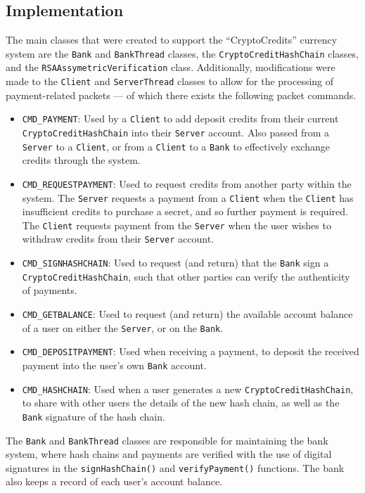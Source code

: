 \documentclass[a4paper,11pt]{article}
\begin{document}
\subsection{Implementation}
The main classes that were created to support the ``CryptoCredits'' currency
system are the \verb+Bank+ and \verb+BankThread+ classes, the
\verb+CryptoCreditHashChain+ classes, and the \verb+RSAAssymetricVerification+
class. Additionally, modifications were made to the \verb+Client+ and
\verb+ServerThread+ classes to allow for the processing of payment-related
packets --- of which there exists the following packet commands.

\begin{itemize}
\item \verb+CMD_PAYMENT+: Used by a \verb+Client+ to add deposit credits from
their current \verb+CryptoCreditHashChain+ into their \verb+Server+ account.
Also passed from a \verb+Server+ to a \verb+Client+, or from a \verb+Client+ to
a \verb+Bank+ to effectively exchange credits through the system.
\item \verb+CMD_REQUESTPAYMENT+: Used to request credits from another party
within the system. The \verb+Server+ requests a payment from a \verb+Client+
when the \verb+Client+ has insufficient credits to purchase a secret, and so
further payment is required. The \verb+Client+ requests payment from the
\verb+Server+ when the user wishes to withdraw credits from their \verb+Server+
account.
\item \verb+CMD_SIGNHASHCHAIN+: Used to request (and return) that the
\verb+Bank+ sign a \verb+CryptoCreditHashChain+, such that other parties can
verify the authenticity of payments.
\item \verb+CMD_GETBALANCE+: Used to request (and return) the available account
balance of a user on either the \verb+Server+, or on the \verb+Bank+.
\item \verb+CMD_DEPOSITPAYMENT+: Used when receiving a payment, to deposit the
received payment into the user's own \verb+Bank+ account.
\item \verb+CMD_HASHCHAIN+: Used when a user generates a new
\verb+CryptoCreditHashChain+, to share with other users the details of the new
hash chain, as well as the \verb+Bank+ signature of the hash chain.
\end{itemize}

The \verb+Bank+ and \verb+BankThread+ classes are responsible for maintaining
the bank system, where hash chains and payments are verified with the use of
digital signatures in the \verb+signHashChain()+ and \verb+verifyPayment()+
functions. The bank also keeps a record of each user's account balance.
\end{document}
